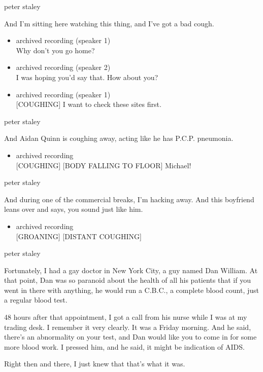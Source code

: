 peter staley

And I'm sitting here watching this thing, and I've got a bad cough.

\begin{itemize}
\item
  archived recording (speaker 1)\\
  Why don't you go home?
\item
  archived recording (speaker 2)\\
  I was hoping you'd say that. How about you?
\item
  archived recording (speaker 1)\\
  {[}COUGHING{]} I want to check these sites first.
\end{itemize}

peter staley

And Aidan Quinn is coughing away, acting like he has P.C.P. pneumonia.

\begin{itemize}
\tightlist
\item
  archived recording\\
  {[}COUGHING{]} {[}BODY FALLING TO FLOOR{]} Michael!
\end{itemize}

peter staley

And during one of the commercial breaks, I'm hacking away. And this
boyfriend leans over and says, you sound just like him.

\begin{itemize}
\tightlist
\item
  archived recording\\
  {[}GROANING{]} {[}DISTANT COUGHING{]}
\end{itemize}

peter staley

Fortunately, I had a gay doctor in New York City, a guy named Dan
William. At that point, Dan was so paranoid about the health of all his
patients that if you went in there with anything, he would run a C.B.C.,
a complete blood count, just a regular blood test.

48 hours after that appointment, I got a call from his nurse while I was
at my trading desk. I remember it very clearly. It was a Friday morning.
And he said, there's an abnormality on your test, and Dan would like you
to come in for some more blood work. I pressed him, and he said, it
might be indication of AIDS.

Right then and there, I just knew that that's what it was.

